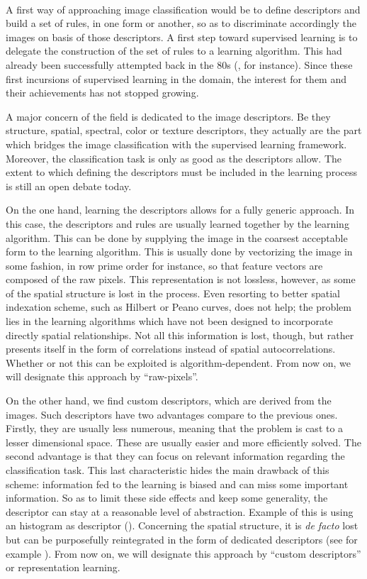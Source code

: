 \documentclass[a4paper]{report}
\begin{document}
\paragraph{}
A first way of approaching image classification would be to define descriptors and build a set of rules, in one form or another, so as to discriminate accordingly the images on basis of those descriptors. A first step toward supervised learning is to delegate the construction of the set of rules to a learning algorithm. This had already been successfully attempted back in the 80s (\cite{earlyDecisionTree}, for instance). Since these first incursions of supervised learning in the domain, the interest for them and their achievements has not stopped growing. 
\par
A major concern of the field is dedicated to the image descriptors. Be they structure, spatial, spectral, color or texture descriptors, they actually are the part which bridges the image classification with the supervised learning framework. Moreover, the classification task is only as good as the descriptors allow. The extent to which defining the descriptors must be included in the learning process is still an open debate today. 
\par
On the one hand, learning the descriptors allows for a fully generic approach. In this case, the descriptors and rules are usually learned together by the learning algorithm. This can be done by supplying the image in the coarsest acceptable form to the learning algorithm. This is usually done by vectorizing the image in some fashion, in row prime order for instance, so that feature vectors are composed of the raw pixels. This representation is not lossless, however, as some of the spatial structure is lost in the process. Even resorting to better spatial indexation scheme, such as Hilbert or Peano curves, does not help; the problem lies in the learning algorithms which have not been designed to incorporate directly spatial relationships. Not all this information is lost, though, but rather presents itself in the form of correlations instead of spatial autocorrelations. Whether or not this can be exploited is algorithm-dependent. From now on, we will designate this approach by ``raw-pixels''.
\par
On the other hand, we find custom descriptors, which are derived from the images. Such descriptors have two advantages compare to the previous ones. Firstly, they are usually less numerous, meaning that the problem is cast to a lesser dimensional space. These are usually easier and more efficiently solved. The second advantage is that they can focus on relevant information regarding the classification task. This last characteristic hides the main drawback of this scheme: information fed to the learning is biased and can miss some important information. So as to limit these side effects and keep some generality, the descriptor can stay at a reasonable level of abstraction. Example of this is using an histogram as descriptor (\cite{histoIntersectSVM}). Concerning the spatial structure, it is \textit{de facto} lost but can be purposefully reintegrated in the form of dedicated descriptors (see for example \cite{geostat}). From now on, we will designate this approach by ``custom descriptors'' or representation learning.
\end{document}

